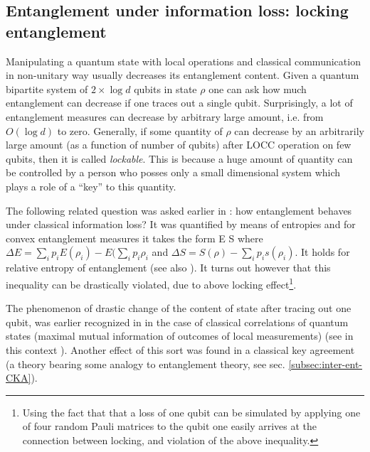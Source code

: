 \documentclass[rmp,12pt,preprint]{revtex4-2}
\begin{document}
\subsection{Entanglement under information
loss: locking entanglement}
\label{subsec:locking}
Manipulating a quantum state with local operations and classical
communication in non-unitary way usually decreases its entanglement
content. Given a quantum bipartite system of $2\times\log d$ qubits in
state $\rho$ one can ask how much entanglement can decrease if one
traces out a single qubit. Surprisingly, a lot of entanglement
measures can decrease by arbitrary large amount, i.e. from
$O(\log d)$ to zero.
Generally, if some quantity of $\rho$ can decrease by an arbitrarily
large amount (as a function of number of qubits) after LOCC operation on
few qubits, then it is called {\it lockable}. This is because a huge
amount of quantity can be controlled by a person who posses only a
small dimensional system which plays a role of a ``key'' to this
quantity.


The following related question was asked earlier in \cite{Wilkens}:
how entanglement behaves under classical information loss?
It was quantified by means of entropies
and for convex entanglement measures it takes the form
\be
\Delta E \leq \Delta S
\label{eq:ent-info}
\ee
where $\Delta E= \sum_i p_i E(\rho_i)-E(\sum_ip_i\rho_i$ and
$\Delta S=S(\rho)-\sum_i p_is(\rho_i)$.
It holds for relative entropy of entanglement \cite{LPSW1999}
(see also \cite{Synak05-asym}). It turns out however that this inequality
can be drastically violated, due to above locking effect\footnote{Using
the fact that  that a loss of  one qubit can be simulated by
applying one of four random Pauli matrices
to the qubit one easily arrives at the connection between locking,
and violation of the above inequality.}.

The phenomenon of drastic change of the content of state  after tracing out one qubit, was earlier recognized in \cite{DiVincenzo-locking}  in the case of
classical correlations  of quantum states (maximal mutual information of
outcomes of local measurements) (see in this context
\cite{string-commitment,bh-locking,small-locking,3basis-locking}).
Another effect of this sort was found in a classical key agreement
\cite{renner-wolf-gap} (a theory bearing some analogy to
entanglement theory, see sec. \ref{subsec:inter-ent-CKA}).
\end{document}
